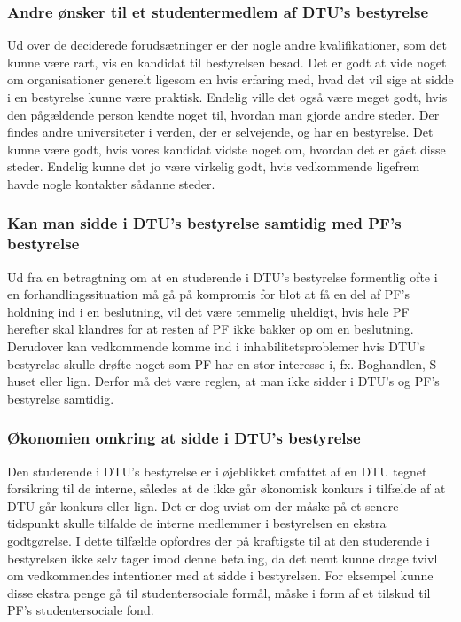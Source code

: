\subsubsection{Andre ønsker til et studentermedlem af DTU’s bestyrelse} 
Ud over de deciderede forudsætninger er der nogle andre kvalifikationer, som det kunne være rart, vis en kandidat til bestyrelsen besad. Det er godt at vide noget om organisationer generelt ligesom en hvis erfaring med, hvad det vil sige at sidde i en bestyrelse kunne være praktisk. Endelig ville det også være meget godt, hvis den pågældende person kendte noget til, hvordan man gjorde andre steder. Der findes andre universiteter i verden, der er selvejende, og har en bestyrelse. Det kunne være godt, hvis vores kandidat vidste noget om, hvordan det er gået disse steder. Endelig kunne det jo være virkelig godt, hvis vedkommende ligefrem havde nogle kontakter sådanne steder.

\subsubsection{Kan man sidde i DTU’s bestyrelse samtidig med PF’s bestyrelse}
Ud fra en betragtning om at en studerende i DTU’s bestyrelse formentlig ofte i en forhandlingssituation må gå på kompromis for blot at få en del af PF’s holdning ind i en beslutning, vil det være temmelig uheldigt, hvis hele PF herefter skal klandres for at resten af PF ikke bakker op om en beslutning. Derudover kan vedkommende komme ind i inhabilitetsproblemer hvis DTU’s bestyrelse skulle drøfte noget som PF har en stor interesse i, fx. Boghandlen, S-huset eller lign. Derfor må det være reglen, at man ikke sidder i DTU’s og PF’s bestyrelse samtidig.

\subsubsection{Økonomien omkring at sidde i DTU’s bestyrelse}
Den studerende i DTU’s bestyrelse er i øjeblikket omfattet af en DTU tegnet forsikring til de interne, således at de ikke går økonomisk konkurs i tilfælde af at DTU går konkurs eller lign. Det er dog uvist om der måske på et senere tidspunkt skulle tilfalde de interne medlemmer i bestyrelsen en ekstra godtgørelse. I dette tilfælde opfordres der på kraftigste til at den studerende i bestyrelsen ikke selv tager imod denne betaling, da det nemt kunne drage tvivl om vedkommendes intentioner med at sidde i bestyrelsen. For eksempel kunne disse ekstra penge gå til studentersociale formål, måske i form af et tilskud til PF’s studentersociale fond.

